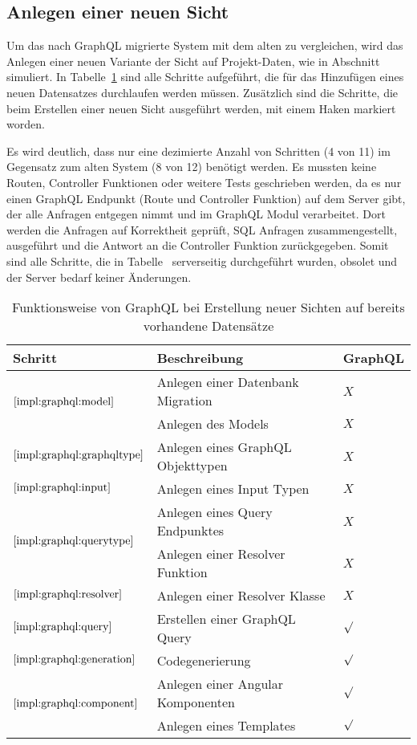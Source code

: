 \subsection{Anlegen einer neuen Sicht}
Um das nach GraphQL migrierte System mit dem alten zu vergleichen, wird das Anlegen einer neuen Variante der Sicht auf Projekt-Daten, wie in Abschnitt~ simuliert.
In Tabelle~\ref{impl:tbl:newview} sind alle Schritte aufgeführt, die für das Hinzufügen eines neuen Datensatzes durchlaufen werden müssen.
Zusätzlich sind die Schritte, die beim Erstellen einer neuen Sicht ausgeführt werden, mit einem Haken markiert worden.

Es wird deutlich, dass nur eine dezimierte Anzahl von Schritten (4 von 11) im Gegensatz zum alten System (8 von 12) benötigt werden.
Es mussten keine Routen, Controller Funktionen oder weitere Tests geschrieben werden, da es nur einen GraphQL Endpunkt (Route und Controller Funktion) auf dem Server gibt, der alle Anfragen entgegen nimmt und im GraphQL Modul verarbeitet. Dort werden die Anfragen auf Korrektheit geprüft,
SQL Anfragen zusammengestellt, ausgeführt und die Antwort an die Controller Funktion zurückgegeben.
Somit sind alle Schritte, die in Tabelle~ serverseitig durchgeführt wurden, obsolet und der Server bedarf keiner Änderungen.

\begin{table}[h!]
	\begin{tabular}{|p{}|p{}|p{}|}
		\hline
		\textbf{Schritt} & \textbf{Beschreibung} & \textbf{GraphQL} \\ \hline
		\multirow{2}{*}{$\ref{impl:graphql:model}$}
			& Anlegen einer Datenbank Migration & $X$ \\
			& Anlegen des Models & $X$ \\ \hline
		$\ref{impl:graphql:graphqltype}$ & Anlegen eines GraphQL Objekttypen &  $X$ \\ \hline
		$\ref{impl:graphql:input}$ & Anlegen eines Input Typen &  $X$ \\ \hline
		\multirow{2}{*}{$\ref{impl:graphql:querytype}$}
			& Anlegen eines Query Endpunktes &  $X$ \\ 
			& Anlegen einer Resolver Funktion &  $X$ \\ \hline
		$\ref{impl:graphql:resolver}$ & Anlegen einer Resolver Klasse &  $X$ \\ \hline
		$\ref{impl:graphql:query}$ & Erstellen einer GraphQL Query &  $\surd$ \\ \hline
		$\ref{impl:graphql:generation}$ & Codegenerierung &  $\surd$ \\ \hline
		\multirow{2}{*}{$\ref{impl:graphql:component}$}
			& Anlegen einer Angular Komponenten & $\surd$ \\
			& Anlegen eines Templates & $\surd$ \\ \hline
	\end{tabular}
	\vspace{5pt}
	\centering
	\caption{Funktionsweise von GraphQL bei Erstellung neuer Sichten auf bereits vorhandene Datensätze}
	\label{impl:tbl:newview}
\end{table}


